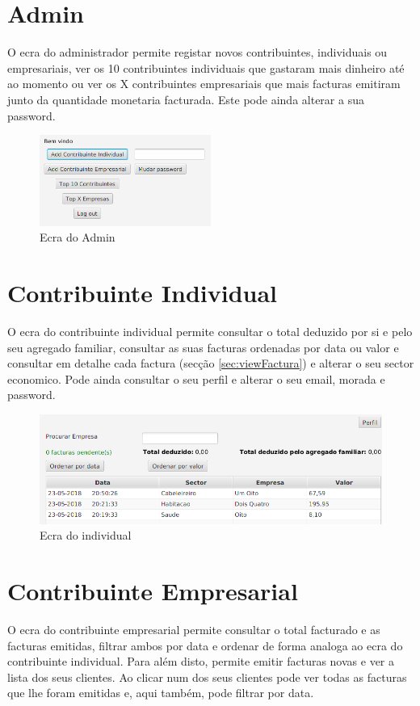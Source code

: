 \documentclass[12pt,a4paper]{report}
\begin{document}
    \section{Admin}
    O ecra do administrador permite registar novos contribuintes, individuais
    ou empresariais, ver os 10 contribuintes individuais que gastaram mais
    dinheiro até ao momento ou ver os X contribuintes empresariais que mais
    facturas emitiram junto da quantidade monetaria facturada.
    Este pode ainda alterar a sua password.
\begin{figure}[h]
    \centering
    \includegraphics[width=0.5\textwidth]{./images/AdminScreen.png}
    \caption{Ecra do Admin}
    \label{fig:admin}
\end{figure}

\pagebreak

    \section{Contribuinte Individual}
    O ecra do contribuinte individual permite consultar o total deduzido por
    si e pelo seu agregado familiar, consultar as suas facturas ordenadas por
    data ou valor e consultar em detalhe cada factura
    (secção \ref{sec:viewFactura}) e alterar o seu sector economico. Pode ainda
    consultar o seu perfil e alterar o seu email, morada e password.

\begin{figure}[h]
    \centering
    \includegraphics[width=\textwidth]{./images/IndividualScreen.png}
    \caption{Ecra do individual}
    \label{fig:individual}
\end{figure}

    \section{Contribuinte Empresarial}
    O ecra do contribuinte empresarial permite consultar o total facturado
    e as facturas emitidas, filtrar ambos por data e ordenar de
    forma analoga ao ecra do contribuinte individual. Para além disto, permite
    emitir facturas novas e ver a lista dos seus clientes. Ao clicar num dos seus
    clientes pode ver todas as facturas que lhe foram emitidas e, aqui
    também, pode filtrar por data.
\end{document}
